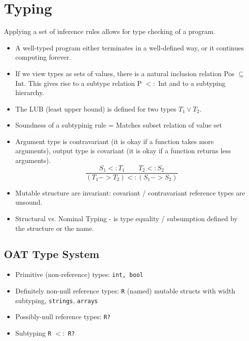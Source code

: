 \section*{Typing}

Applying a set of inference rules allows for type checking of a program. 

\begin{itemize}
	\item A well-typed program either terminates in a well-defined way, or it continues computing forever.
	
	\item If we view types as sets of values, there is a natural inclusion relation Pos $ \subseteq $ Int. This gives rise to a subtype relation P $<:$ Int and to a subtyping hierarchy.

	\item The LUB (least upper bound) is defined for two types $T_1 \vee T_2$.
	
	\item Soundness of a subtypinig rule = Matches subset relation of value set
	
	\item Argument type is contravariant (it is okay if a function takes more arguments), output type is covariant (it is okay if a function returns less arguments).
	$$\frac{S_1 <: T_1 \qquad T_2 <: S_2}{(T_1 -> T_2) <: (S_1 -> S_2)}$$

	\item Mutable structure are invariant: covariant / contravariant reference types are unsound.
		
	\item Structural vs. Nominal Typing - is type equality / subsumption defined by the structure or the name.
\end{itemize}

\subsection*{OAT Type System}
\begin{itemize}
	\item Primitive (non-reference) types: \texttt{int, bool}
	
	\item Definitely non-null reference types: \texttt{R} (named) mutable structs with width subtyping, \texttt{strings}, \texttt{arrays}
	
	\item Possibly-null reference types: \texttt{R?}
	
	\item Subtyping \texttt{R} $<:$ \texttt{R?}
\end{itemize}
